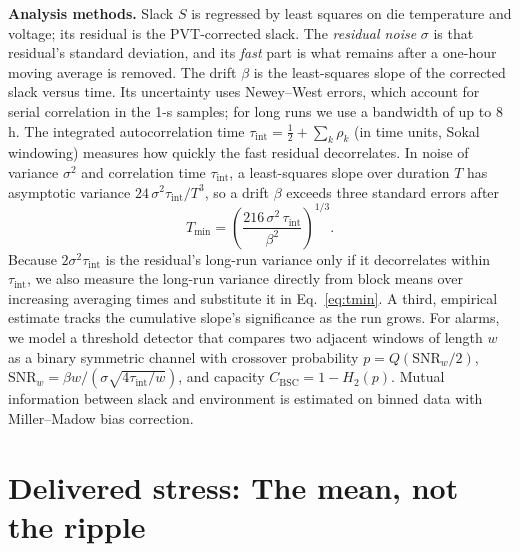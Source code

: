 \documentclass[10pt,twocolumn]{article}
\newcommand{\Tmin}{T_{\min}}
\newcommand{\tint}{\tau_{\mathrm{int}}}
\begin{document}
\textbf{Analysis methods.} Slack $S$ is regressed by least squares on die temperature and voltage; its residual is the PVT-corrected slack. The \emph{residual noise} $\sigma$ is that residual's standard deviation, and its \emph{fast} part is what remains after a one-hour moving average is removed. The drift $\beta$ is the least-squares slope of the corrected slack versus time. Its uncertainty uses Newey--West errors, which account for serial correlation in the 1-s samples; for long runs we use a bandwidth of up to 8\,h. The integrated autocorrelation time $\tint=\tfrac{1}{2}+\sum_k\rho_k$ (in time units, Sokal windowing) measures how quickly the fast residual decorrelates. In noise of variance $\sigma^2$ and correlation time $\tint$, a least-squares slope over duration $T$ has asymptotic variance $24\,\sigma^2\tint/T^3$, so a drift $\beta$ exceeds three standard errors after
\begin{equation}
\Tmin=\left(\frac{216\,\sigma^2\,\tint}{\beta^2}\right)^{1/3}.
\label{eq:tmin}
\end{equation}
Because $2\sigma^2\tint$ is the residual's long-run variance only if it decorrelates within $\tint$, we also measure the long-run variance directly from block means over increasing averaging times and substitute it in Eq.~\eqref{eq:tmin}. A third, empirical estimate tracks the cumulative slope's significance as the run grows. For alarms, we model a threshold detector that compares two adjacent windows of length $w$ as a binary symmetric channel with crossover probability $p=Q(\mathrm{SNR}_w/2)$, $\mathrm{SNR}_w=\beta w/(\sigma\sqrt{4\tint/w})$, and capacity $C_{\mathrm{BSC}}=1-H_2(p)$. Mutual information between slack and environment is estimated on binned data with Miller--Madow bias correction.

\section{Delivered stress: The mean, not the ripple}
\end{document}
